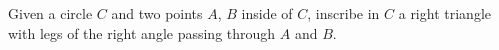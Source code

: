 Given a circle $C$ and two points $A$, $B$ inside of $C$, inscribe in $C$ a right triangle with legs of the right angle passing through $A$ and $B$.
